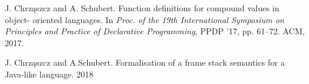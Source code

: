 \documentclass[]{pracamgr}
\renewcommand \| {\hspace{0.75em} | \hspace{0.75em} }
\renewcommand \[ {[\![}
\renewcommand \] {]\!]}
\theoremstyle{definition}
\begin{document}
\appendix
\begin{thebibliography}{99}

 J. Chrząszcz and A. Schubert. Function definitions for compound values in object-
oriented languages. In \textit{Proc. of the 19th International Symposium on Principles
and Practice of Declarative Programming}, PPDP ’17, pp. 61–72. ACM, 2017.

 J. Chrząszcz and A.Schubert. Formalisation of a frame stack semantics for a Java-like language. 2018

\end{thebibliography}
\end{document}
